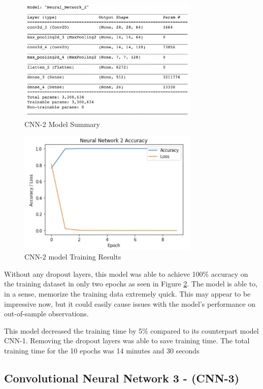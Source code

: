 \documentclass[5p,authoryear]{elsarticle}
\begin{document}
\begin{figure}[!htb] \centering
	\includegraphics[width=3.4in]{figures/CNN-2-Summary.png}
	\caption[]{CNN-2 Model Summary} 
	\label{CNN-2 Model Summary} 
\end{figure}


\begin{figure}[!htb] \centering
	\includegraphics[width=3.4in]{figures/CNN-2-training.png}
	\caption[]{CNN-2 model Training Results} 
	\label{CNN-2 model Training Results} 
\end{figure}


Without any dropout layers, this model was able to achieve 100\% accuracy on the training dataset in only two epochs as seen in Figure \ref{CNN-2 model Training Results}. The model is able to, in a sense, memorize the training data extremely quick. This may appear to be impressive now, but it could easily cause issues with the model's performance on out-of-sample observations. 

This model decreased the training time by 5\% compared to its counterpart model CNN-1. Removing the dropout layers was able to save training time. The total training time for the 10 epochs was 14 minutes and 30 seconds 


\subsection{Convolutional Neural Network 3 - (CNN-3)}
\end{document}
